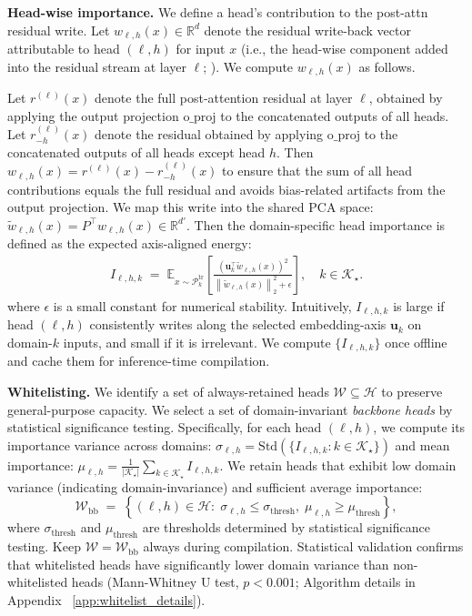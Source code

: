 \textbf{Head-wise importance.}
We define a head's contribution to the post-attn residual write.
Let $w_{\ell,h}(x)\in\mathbb{R}^d$ denote the residual write-back vector attributable to head
$(\ell,h)$ for input $x$ (i.e., the head-wise component added into the residual stream at layer $\ell$; \citealp{elhage2021framework}).
We compute $w_{\ell,h}(x)$ as follows.

Let $r^{(\ell)}(x)$ denote the full post-attention residual at layer $\ell$, obtained by applying the output projection $\text{o\_proj}$ to the concatenated outputs of all heads.
Let $r^{(\ell)}_{-h}(x)$ denote the residual obtained by applying $\text{o\_proj}$ to the concatenated outputs of all heads except head $h$.
Then $w_{\ell,h}(x) = r^{(\ell)}(x) - r^{(\ell)}_{-h}(x)$ to ensure that the sum of all head contributions equals the full residual and avoids bias-related artifacts from the output projection.
We map this write into the shared PCA space:
$\tilde{w}_{\ell,h}(x)=P^\top w_{\ell,h}(x)\in\mathbb{R}^{d'}$.
Then the domain-specific head importance is defined as the expected axis-aligned energy:
{\small
\begin{equation}
\label{eq:psp:importance}
\begin{aligned}
I_{\ell,h,k}
\;=\;
\mathbb{E}_{x\sim \mathcal{P}_k^{\mathrm{tr}}}
\left[
\frac{\left(\mathbf{u}_k^\top \tilde{w}_{\ell,h}\left(x\right)\right)^2}
{\left\|\tilde{w}_{\ell,h}(x)\right\|_2^2+\epsilon}
\right],
\quad k\in\mathcal{K}_\star.
\end{aligned}
\end{equation}
}
where $\epsilon$ is a small constant for numerical stability. Intuitively, $I_{\ell,h,k}$ is large if head $(\ell,h)$ consistently writes along the selected
embedding-axis $\mathbf{u}_k$ on domain-$k$ inputs, and small if it is irrelevant. We compute $\{I_{\ell,h,k}\}$ once offline and cache them for inference-time compilation.


\textbf{Whitelisting.}
We identify a set of always-retained heads $\mathcal{W}\subseteq \mathcal{H}$ to preserve general-purpose capacity.
We select a set of domain-invariant \emph{backbone heads} by statistical significance testing.
Specifically, for each head $(\ell,h)$, we compute its importance variance across domains:
$\sigma_{\ell,h} = \mathrm{Std}(\{I_{\ell,h,k}: k\in\mathcal{K}_\star\})$ and mean importance:
$\mu_{\ell,h} = \frac{1}{|\mathcal{K}_\star|}\sum_{k\in\mathcal{K}_\star} I_{\ell,h,k}$.
We retain heads that exhibit low domain variance (indicating domain-invariance) and sufficient average importance:
{\small
\begin{equation}
\label{eq:psp:whitelist_backbone}
\mathcal{W}_{\mathrm{bb}}
\;=\;
\left\{
\left(\ell,h\right)\in\mathcal{H}:\;
\sigma_{\ell,h} \leq \sigma_{\mathrm{thresh}},\;
\mu_{\ell,h} \geq \mu_{\mathrm{thresh}}
\right\},
\end{equation}
}
where $\sigma_{\mathrm{thresh}}$ and $\mu_{\mathrm{thresh}}$ are thresholds determined by statistical significance testing.
Keep $\mathcal{W}=\mathcal{W}_{\mathrm{bb}}$ always during compilation.
Statistical validation confirms that whitelisted heads have significantly lower domain variance than non-whitelisted heads (Mann-Whitney U test, $p<0.001$; Algorithm details in Appendix ~\ref{app:whitelist_details}).

